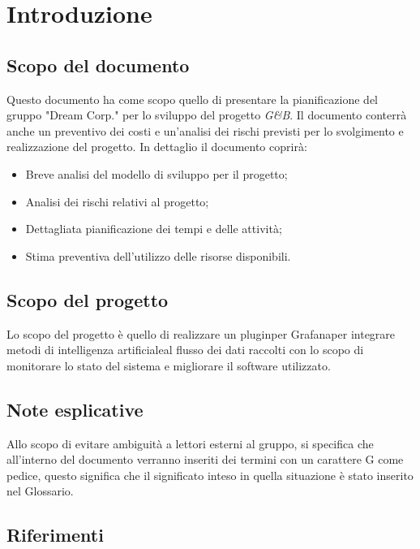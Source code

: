 \section{Introduzione}
		\subsection{Scopo del documento}

			Questo documento ha come scopo quello di presentare la pianificazione del gruppo "Dream Corp." per lo sviluppo del progetto \textit{G\&B}.
			Il documento conterrà anche un preventivo dei costi e un'analisi dei rischi previsti per lo svolgimento e realizzazione del progetto.\newline
			In dettaglio il documento coprirà:
			\begin{itemize}
				\item Breve analisi del modello di sviluppo per il progetto; 
				\item Analisi dei rischi relativi al progetto;
				\item Dettagliata pianificazione dei tempi e delle attività;
				\item Stima preventiva dell'utilizzo delle risorse disponibili.
			\end{itemize}

		\subsection{Scopo del progetto}

			Lo scopo del progetto è quello di realizzare un plugin\pedice per Grafana\pedice per integrare metodi di intelligenza artificiale\pedice al flusso dei dati raccolti con lo scopo di monitorare lo stato del sistema e migliorare il software utilizzato.

		\subsection{Note esplicative}

			Allo scopo di evitare ambiguità a lettori esterni al gruppo, si specifica che all'interno del documento verranno inseriti dei termini con un carattere G come pedice, questo significa che il significato inteso in quella situazione è stato inserito nel Glossario.

		\newpage
		\subsection{Riferimenti}

